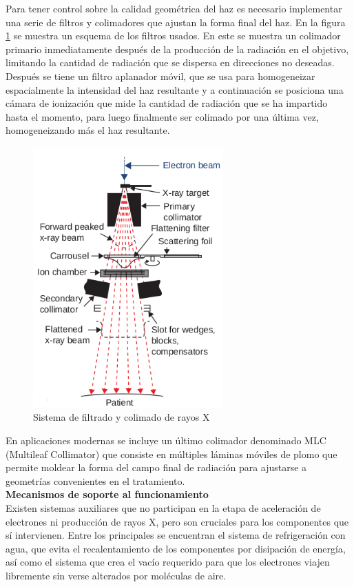 Para tener control sobre la calidad geométrica del haz es necesario implementar una serie de filtros y colimadores que ajustan la forma final del haz. En la figura \ref{fig:filtrosRayosX} se muestra un esquema de los filtros usados. En este se muestra un colimador primario inmediatamente después de la producción de la radiación en el objetivo, limitando la cantidad de radiación que se dispersa en direcciones no deseadas. Después se tiene un filtro aplanador móvil, que se usa para homogeneizar espacialmente la intensidad del haz resultante y a continuación se posiciona una cámara de ionización que mide la cantidad de radiación que se ha impartido hasta el momento, para luego finalmente ser colimado por una última vez, homogeneizando más el haz resultante.\\
\begin{figure}[H]
	\centering
	\includegraphics[width=0.7\linewidth, height=10cm]{images/filtros.png}
	\caption{Sistema de filtrado y colimado de rayos X\cite{khan2014the}}
	\label{fig:filtrosRayosX}
\end{figure}
En aplicaciones modernas se incluye un último colimador denominado MLC (Multileaf Collimator) que consiste en múltiples láminas móviles de plomo que permite moldear la forma del campo final de radiación para ajustarse a geometrías convenientes en el tratamiento.\\


\textbf{Mecanismos de soporte al funcionamiento}\\

Existen sistemas auxiliares que no participan en la etapa de aceleración de electrones ni producción de rayos X, pero son cruciales para los componentes que sí intervienen. Entre los principales se encuentran el sistema de refrigeración con agua, que evita el recalentamiento de los componentes por disipación de energía, así como el sistema que crea el vacío requerido para que los electrones viajen libremente sin verse alterados por moléculas de aire.\\

